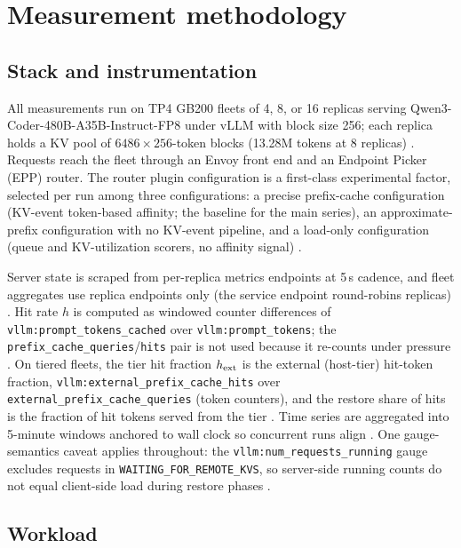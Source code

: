 \section{Measurement methodology}
\label{sec:method}

\subsection{Stack and instrumentation}
\label{sec:stack}

All measurements run on TP4 GB200 fleets of 4, 8, or 16 replicas
serving Qwen3-Coder-480B-A35B-Instruct-FP8 under vLLM with block
size 256; each replica holds a KV pool of $6486 \times 256$-token blocks
(13.28M tokens at 8 replicas) . Requests reach
the fleet through an Envoy front end and an Endpoint Picker (EPP)
router. The router plugin configuration is a first-class
experimental factor, selected per run among three configurations: a
precise prefix-cache configuration (KV-event token-based affinity;
the baseline for the main series), an approximate-prefix
configuration with no KV-event pipeline, and a load-only
configuration (queue and KV-utilization scorers, no affinity
signal) .

Server state is scraped from per-replica metrics endpoints at 5\,s
cadence, and fleet aggregates use replica endpoints only (the
service endpoint round-robins replicas) . Hit rate $h$ is
computed as windowed counter differences of
\texttt{vllm:prompt\_tokens\_cached} over \texttt{vllm:prompt\_tokens}; the
\texttt{prefix\_cache\_queries}/\texttt{hits} pair is not used because it re-counts
under pressure . On tiered fleets, the tier hit
fraction $h_{\mathrm{ext}}$ is the external (host-tier) hit-token fraction,
\texttt{vllm:external\_prefix\_cache\_hits} over \texttt{external\_prefix\_cache\_queries}
(token counters), and the restore share of hits is the fraction of
hit tokens served from the tier . Time series
are aggregated into 5-minute windows anchored to wall clock so
concurrent runs align . One gauge-semantics
caveat applies throughout: the \texttt{vllm:num\_requests\_running} gauge
excludes requests in \texttt{WAITING\_FOR\_REMOTE\_KVS}, so server-side running
counts do not equal client-side load during restore phases .

\subsection{Workload}
\label{sec:workload}

